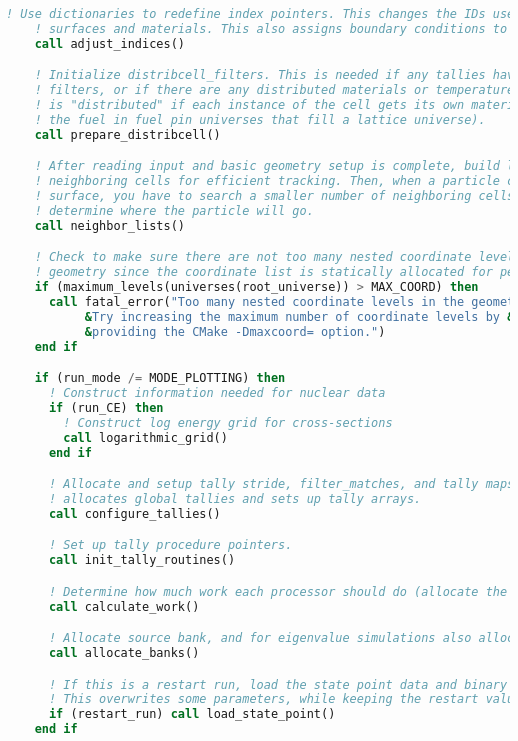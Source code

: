 \documentclass[10pt]{article}
\numberwithin{equation}{section} %
\begin{document}
\begin{lstlisting}[language=fortran]
    ! Use dictionaries to redefine index pointers. This changes the IDs used for
    ! surfaces and materials. This also assigns boundary conditions to surfaces.
    call adjust_indices()

    ! Initialize distribcell_filters. This is needed if any tallies have distribcell 
    ! filters, or if there are any distributed materials or temperatures. A material 
    ! is "distributed" if each instance of the cell gets its own material (such as 
    ! the fuel in fuel pin universes that fill a lattice universe). 
    call prepare_distribcell()

    ! After reading input and basic geometry setup is complete, build lists of
    ! neighboring cells for efficient tracking. Then, when a particle crosses a
    ! surface, you have to search a smaller number of neighboring cells to 
    ! determine where the particle will go. 
    call neighbor_lists()

    ! Check to make sure there are not too many nested coordinate levels in the
    ! geometry since the coordinate list is statically allocated for performance. 
    if (maximum_levels(universes(root_universe)) > MAX_COORD) then
      call fatal_error("Too many nested coordinate levels in the geometry. &
           &Try increasing the maximum number of coordinate levels by &
           &providing the CMake -Dmaxcoord= option.")
    end if

    if (run_mode /= MODE_PLOTTING) then
      ! Construct information needed for nuclear data
      if (run_CE) then
        ! Construct log energy grid for cross-sections
        call logarithmic_grid()
      end if

      ! Allocate and setup tally stride, filter_matches, and tally maps. This 
      ! allocates global tallies and sets up tally arrays. 
      call configure_tallies()

      ! Set up tally procedure pointers. 
      call init_tally_routines()

      ! Determine how much work each processor should do (allocate the particles amongst the processors). 
      call calculate_work()

      ! Allocate source bank, and for eigenvalue simulations also allocate the fission bank. If using OpenMP, each thread needs its own private fission bank. At the end of each generation, all of the information from the OpenMP threads is re-combined into the master_fission_bank. 
      call allocate_banks()

      ! If this is a restart run, load the state point data and binary source file. 
      ! This overwrites some parameters, while keeping the restart values of others. 
      if (restart_run) call load_state_point()
    end if


\end{lstlisting}
\end{document}
